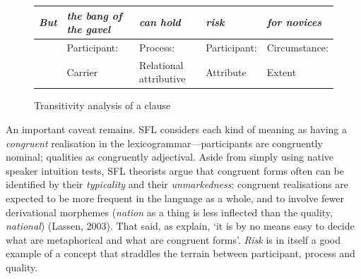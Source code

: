 			\begin{figure}[htb]
			\centering \small \onehalfspacing
    			\begin{tabularx}{0.75\textwidth}{|l|l|X|X|X|}
    			\hline
    			\emph{But}     & \emph{the bang of the gavel}             & \emph{can hold}          & \emph{risk} & \emph{for novices}          \\ \hline
    			~ & Participant: & Process: & Participant: & Circumstance:  \\
    			    			~ & Carrier & Relational \mbox{attributive} & Attribute &  Extent \\ \hline
    			\end{tabularx}
			\caption{Transitivity analysis of a clause}
			    			\label{fig:transannotation}
			\end{figure}

		An important caveat remains. SFL considers each kind of meaning as having a \emph{congruent} realisation in the lexicogrammar---participants are congruently nominal; qualities as congruently adjectival. Aside from simply using native speaker intuition tests, SFL theorists argue that congruent forms often can be identified by their \emph{typicality} and their \emph{unmarkedness}: congruent realisations are expected to be more frequent in the language as a whole, and to involve fewer derivational morphemes (\emph{nation} as a thing is less inflected than the quality, \emph{national}) (Lassen, 2003). That said, as  explain, `it is by no means easy to decide what are metaphorical and what are congruent forms'. \emph{Risk} is in itself a good example of a concept that straddles the terrain between participant, process and quality.

